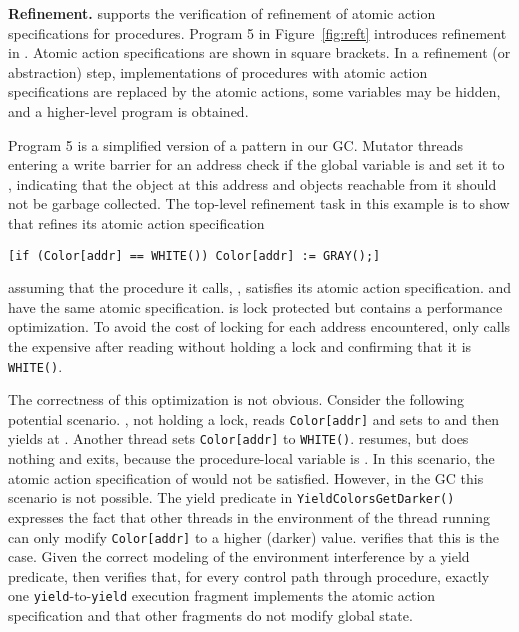 %

{\bf Refinement.} 
\civl supports the verification of refinement of atomic action specifications for
procedures. Program 5 in Figure~\ref{fig:reft} introduces refinement in \civl. 
Atomic action specifications are shown in square brackets. 
In a refinement (or abstraction) step, implementations of procedures with atomic action
specifications are replaced by the atomic actions, some variables may
be hidden, and a higher-level program is obtained. 

Program 5 is a simplified version of a pattern in our GC.
Mutator threads entering a write barrier for an
address  check
if the global variable  is 
and set it to , indicating that the object at this address
and objects reachable from it should not be garbage collected. The
top-level refinement task in this example is to show that 
refines its atomic action specification 
\begin{verbatim}
[if (Color[addr] == WHITE()) Color[addr] := GRAY();]
\end{verbatim}
assuming that the procedure it calls, , satisfies its
atomic action specification.  and  have the same atomic
specification.   is lock protected but  contains a
performance optimization. 
To avoid the cost of locking for each
address encountered, 
 only calls the expensive 
 after reading  without holding a lock
and confirming that it is {\tt WHITE()}.

The correctness of this
optimization is not obvious. Consider the following potential
scenario. , not holding a lock, reads {\tt Color[addr]} and
sets  to  and then yields at
. Another thread sets {\tt Color[addr]} to
{\tt WHITE()}.  resumes, but does nothing and exits,
because the procedure-local variable  is . In this scenario, the atomic action
specification of  would not be satisfied. However, in the GC this
scenario is not possible. 
The yield
predicate in {\tt YieldColorsGetDarker()} expresses the fact that
other threads in the environment of the thread running  can
only modify {\tt Color[addr]} to a higher (darker)
value. \civl verifies that this is the case. 
Given the correct
modeling of the environment interference by a yield predicate,
\civl then verifies that, for every control path through 
procedure, exactly one {\tt yield}-to-{\tt yield} execution
fragment implements the atomic action specification and that other fragments do not modify
global state. 

